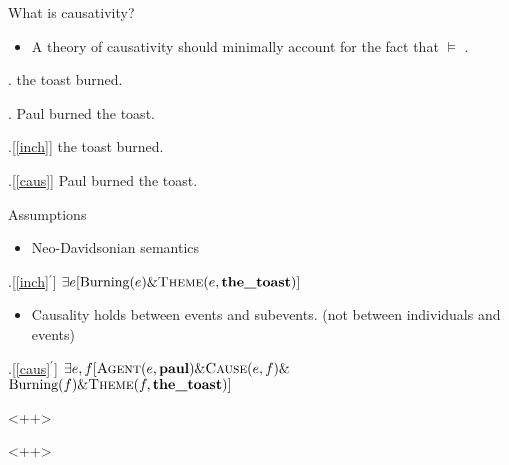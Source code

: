 \documentclass[Proposal]{subfiles}
\begin{document}
\begin{frame}
  {What is causativity?}

  \begin{itemize}
    \item A theory of causativity should minimally account for the fact that \NNext $\vDash$ \Next.
  \end{itemize}
  \ex.\label{inch} {\rm the toast burned.}

  \ex.\label{caus} {\rm Paul burned the toast.}

\end{frame}
\begin{frame}
  \ex.[\ref{inch}] {\rm the toast burned.}

  \ex.[\ref{caus}] {\rm Paul burned the toast.}

  \begin{block}
    {Assumptions}
    \begin{itemize}
      \item Neo-Davidsonian semantics
    \end{itemize}
    \ex.[\ref{inch}$^\prime$] $\exists e[\text{Burning}(e) \& \textsc{Theme}(e, \textbf{the\_toast})]$

    \begin{itemize}
      \item Causality holds between events and subevents. (not between individuals and events)
    \end{itemize}
    \ex.[\ref{caus}$^\prime$] $\exists e,f[\textsc{Agent}(e, \textbf{paul}) \& \textsc{Cause}(e, f) \&$\\\hspace{3em}$ \text{Burning}(f) \& \textsc{Theme}(f, \textbf{the\_toast})]$

  \end{block}<++>
  
\end{frame}<++>
\end{document}
